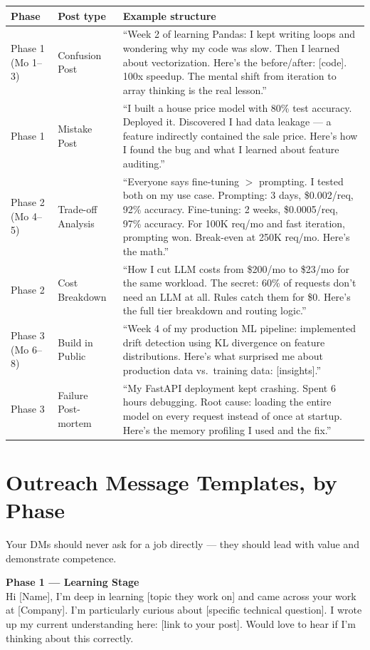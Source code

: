 \begin{longtable}{p{} p{} p{}}
\toprule
\textbf{Phase} & \textbf{Post type} & \textbf{Example structure} \\
\midrule
\endhead
Phase 1 (Mo 1--3) & Confusion Post & ``Week 2 of learning Pandas: I kept writing loops and wondering why my code
was slow. Then I learned about vectorization. Here's the before/after: [code]. 100x speedup. The mental shift from
iteration to array thinking is the real lesson.'' \\
Phase 1 & Mistake Post & ``I built a house price model with 80\% test accuracy. Deployed it. Discovered I had
data leakage --- a feature indirectly contained the sale price. Here's how I found the bug and what I learned
about feature auditing.'' \\
Phase 2 (Mo 4--5) & Trade-off Analysis & ``Everyone says fine-tuning $>$ prompting. I tested both on my use case.
Prompting: 3 days, \$0.002/req, 92\% accuracy. Fine-tuning: 2 weeks, \$0.0005/req, 97\% accuracy. For 100K req/mo
and fast iteration, prompting won. Break-even at 250K req/mo. Here's the math.'' \\
Phase 2 & Cost Breakdown & ``How I cut LLM costs from \$200/mo to \$23/mo for the same workload. The secret: 60\%
of requests don't need an LLM at all. Rules catch them for \$0. Here's the full tier breakdown and routing
logic.'' \\
Phase 3 (Mo 6--8) & Build in Public & ``Week 4 of my production ML pipeline: implemented drift detection using KL
divergence on feature distributions. Here's what surprised me about production data vs.\ training data:
[insights].'' \\
Phase 3 & Failure Post-mortem & ``My FastAPI deployment kept crashing. Spent 6 hours debugging. Root cause:
loading the entire model on every request instead of once at startup. Here's the memory profiling I used and the
fix.'' \\
\bottomrule
\end{longtable}

\section{Outreach Message Templates, by Phase}

Your DMs should never ask for a job directly --- they should lead with value and demonstrate competence.

\begin{template}
\textbf{Phase 1 --- Learning Stage}\\[4pt]
Hi [Name], I'm deep in learning [topic they work on] and came across your work at [Company]. I'm particularly
curious about [specific technical question]. I wrote up my current understanding here: [link to your post]. Would
love to hear if I'm thinking about this correctly.
\end{template}

